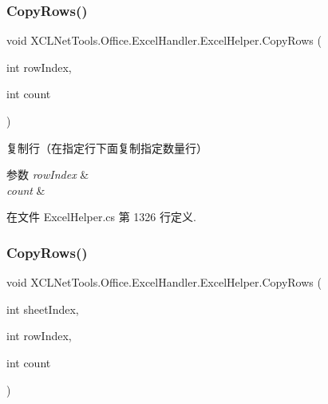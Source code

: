 \subsubsection{\texorpdfstring{Copy\+Rows()}{CopyRows()}\hspace{0.1cm}{\footnotesize\ttfamily [1/2]}}
{\footnotesize\ttfamily void X\+C\+L\+Net\+Tools.\+Office.\+Excel\+Handler.\+Excel\+Helper.\+Copy\+Rows (\begin{DoxyParamCaption}\item[{int}]{row\+Index,  }\item[{int}]{count }\end{DoxyParamCaption})}



复制行（在指定行下面复制指定数量行） 


\begin{DoxyParams}{参数}
{\em row\+Index} & \\
\hline
{\em count} & \\
\hline
\end{DoxyParams}


在文件 Excel\+Helper.\+cs 第 1326 行定义.

\mbox{\label{class_x_c_l_net_tools_1_1_office_1_1_excel_handler_1_1_excel_helper_ae5ca11d360518bfcf0ec30506120adfb}} 
\subsubsection{\texorpdfstring{Copy\+Rows()}{CopyRows()}\hspace{0.1cm}{\footnotesize\ttfamily [2/2]}}
{\footnotesize\ttfamily void X\+C\+L\+Net\+Tools.\+Office.\+Excel\+Handler.\+Excel\+Helper.\+Copy\+Rows (\begin{DoxyParamCaption}\item[{int}]{sheet\+Index,  }\item[{int}]{row\+Index,  }\item[{int}]{count }\end{DoxyParamCaption})}



